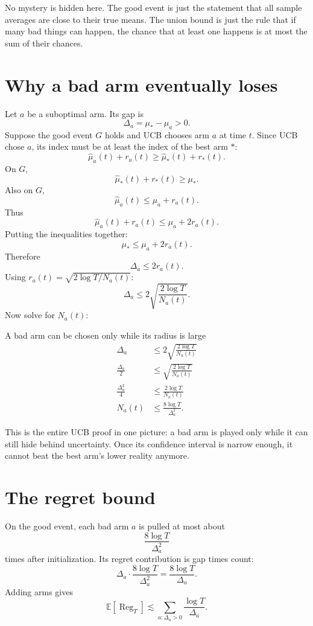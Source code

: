 \documentclass[en,nofont,11pt]{elegantbook}
\newcommand{\E}{\mathbb{E}}
\providecommand{\Reg}{\operatorname{Reg}}
\begin{document}
No mystery is hidden here. The good event is just the statement that all sample averages are close to their true means. The union bound is just the rule that if many bad things can happen, the chance that at least one happens is at most the sum of their chances.

\section{Why a bad arm eventually loses}

Let $a$ be a suboptimal arm. Its gap is
\[
\Delta_a=\mu_* - \mu_a>0.
\]
Suppose the good event $G$ holds and UCB chooses arm $a$ at time $t$. Since UCB chose $a$, its index must be at least the index of the best arm $*$:
\[
\widehat\mu_a(t)+r_a(t)
\geq
\widehat\mu_*(t)+r_*(t).
\]
On $G$,
\[
\widehat\mu_*(t)+r_*(t)\geq \mu_*.
\]
Also on $G$,
\[
\widehat\mu_a(t)
\leq \mu_a+r_a(t).
\]
Thus
\[
\widehat\mu_a(t)+r_a(t)
\leq
\mu_a+2r_a(t).
\]
Putting the inequalities together:
\[
\mu_*
\leq
\mu_a+2r_a(t).
\]
Therefore
\[
\Delta_a\leq 2r_a(t).
\]
Using $r_a(t)=\sqrt{2\log T/N_a(t)}$:
\[
\Delta_a\leq 2\sqrt{\frac{2\log T}{N_a(t)}}.
\]
Now solve for $N_a(t)$:

\begin{derivationbox}{A bad arm can be chosen only while its radius is large}
\[
\begin{aligned}
\Delta_a&\leq 2\sqrt{\frac{2\log T}{N_a(t)}}\\
\frac{\Delta_a}{2}&\leq \sqrt{\frac{2\log T}{N_a(t)}}\\
\frac{\Delta_a^2}{4}&\leq \frac{2\log T}{N_a(t)}\\
N_a(t)&\leq \frac{8\log T}{\Delta_a^2}.
\end{aligned}
\]
\end{derivationbox}

This is the entire UCB proof in one picture: a bad arm is played only while it can still hide behind uncertainty. Once its confidence interval is narrow enough, it cannot beat the best arm's lower reality anymore.

\section{The regret bound}

On the good event, each bad arm $a$ is pulled at most about
\[
\frac{8\log T}{\Delta_a^2}
\]
times after initialization. Its regret contribution is gap times count:
\[
\Delta_a\cdot \frac{8\log T}{\Delta_a^2}
=
\frac{8\log T}{\Delta_a}.
\]
Adding arms gives
\[
\E[\Reg_T]
\lesssim
\sum_{a:\Delta_a>0}\frac{\log T}{\Delta_a}.
\]
\end{document}
